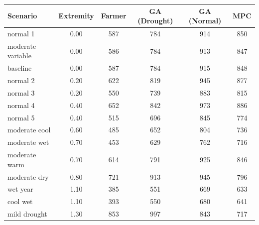 \documentclass[preprint,12pt]{elsarticle}
\begin{document}
\begin{table}[ht]
\centering
\small
\begin{tabular}{|l|c|c|c|c|c|}
\hline
Scenario & Extremity & Farmer & GA (Drought) & GA (Normal) & MPC \\
\hline\hline
normal 1             & 0.00 & \cellcolor{rev500}587 & \cellcolor{rev700}784 & \cellcolor{rev900}914 & \cellcolor{rev800}850 \\
moderate variable    & 0.00 & \cellcolor{rev500}586 & \cellcolor{rev700}784 & \cellcolor{rev900}913 & \cellcolor{rev800}847 \\
baseline             & 0.00 & \cellcolor{rev500}587 & \cellcolor{rev700}784 & \cellcolor{rev900}915 & \cellcolor{rev800}848 \\
normal 2             & 0.20 & \cellcolor{rev600}622 & \cellcolor{rev800}819 & \cellcolor{rev900}945 & \cellcolor{rev800}877 \\
normal 3             & 0.20 & \cellcolor{rev500}550 & \cellcolor{rev700}739 & \cellcolor{rev800}883 & \cellcolor{rev800}815 \\
normal 4             & 0.40 & \cellcolor{rev600}652 & \cellcolor{rev800}842 & \cellcolor{rev900}973 & \cellcolor{rev800}886 \\
normal 5             & 0.40 & \cellcolor{rev500}515 & \cellcolor{rev600}696 & \cellcolor{rev800}845 & \cellcolor{rev700}774 \\
moderate cool        & 0.60 & \cellcolor{rev400}485 & \cellcolor{rev600}652 & \cellcolor{rev800}804 & \cellcolor{rev700}736 \\
moderate wet         & 0.70 & \cellcolor{rev400}453 & \cellcolor{rev600}629 & \cellcolor{rev700}762 & \cellcolor{rev700}716 \\
moderate warm        & 0.70 & \cellcolor{rev600}614 & \cellcolor{rev700}791 & \cellcolor{rev900}925 & \cellcolor{rev800}846 \\
moderate dry         & 0.80 & \cellcolor{rev700}721 & \cellcolor{rev900}913 & \cellcolor{rev900}945 & \cellcolor{rev700}796 \\
wet year             & 1.10 & \cellcolor{rev400}385 & \cellcolor{rev500}551 & \cellcolor{rev600}669 & \cellcolor{rev600}633 \\
cool wet             & 1.10 & \cellcolor{rev400}393 & \cellcolor{rev500}550 & \cellcolor{rev600}680 & \cellcolor{rev600}641 \\
mild drought         & 1.30 & \cellcolor{rev800}853 & \cellcolor{rev1000}997 & \cellcolor{rev800}843 & \cellcolor{rev700}717 \\

\end{tabular}
\end{table}
\end{document}
